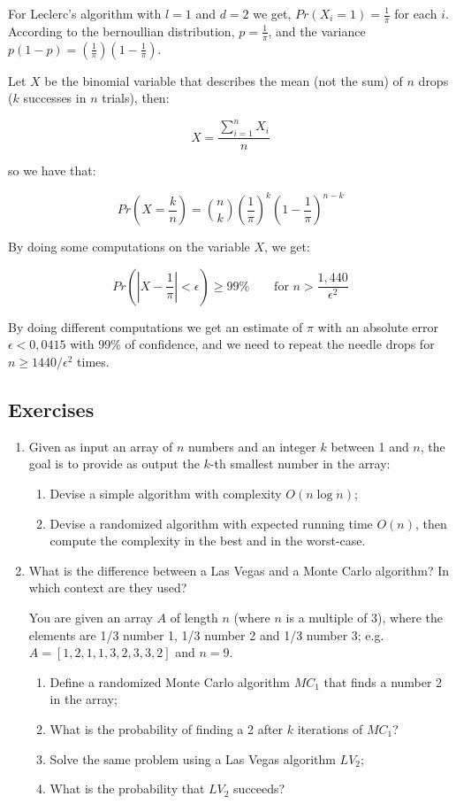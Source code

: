 For Leclerc’s algorithm with $l=1$ and $d=2$ we get, $Pr(X_i= 1) = \frac{1}{\pi}$ for each $i$. According to the bernoullian distribution, $p = \frac{1}{\pi}$, and the variance $p(1-p)= (\frac{1}{\pi}) (1- \frac{1}{\pi})$.

Let $X$ be the binomial variable that describes the mean (not the sum) of $n$ drops ($k$ successes in $n$ trials), then:

$$
X = \frac{\sum_{i = 1}^n X_i}{n}
$$

so we have that:

$$
Pr\left(X = \frac{k}{n}\right) = \binom{n}{k} \left(\frac{1}{\pi}\right)^k \left(1 - \frac{1}{\pi}\right)^{n-k}
$$

By doing some computations on the variable $X$, we get:

$$
Pr\left( \left|X-\frac{1}{\pi}\right| < \epsilon \right) \geq 99\% \qquad \text{for } n > \frac{1,440}{\epsilon^2}
$$

By doing different computations we get an estimate of $\pi$ with an absolute error $\epsilon < 0,0415$ with 99\% of confidence, and we need to repeat the needle drops for $n \geq 1440/\epsilon^2$ times.

\newpage
\subsection{Exercises}
\begin{enumerate}
    \item Given as input an array of $n$ numbers and an integer $k$ between 1 and $n$, the goal is to provide as output the $k$-th smallest number in the array:
    \begin{enumerate}
        \item Devise a simple algorithm with complexity $O(n \log n)$;
        \item Devise a randomized algorithm with expected running time $O(n)$, then compute the complexity in the best and in the worst-case.
    \end{enumerate}
    \item What is the difference between a Las Vegas and a Monte Carlo algorithm? In which context are they used?

    You are given an array $A$ of length $n$ (where $n$ is a multiple of 3), where the elements are 1/3 number 1, 1/3 number 2 and 1/3 number 3; e.g. $A = [1,2,1,1,3,2,3,3,2]$ and $n = 9$.
    \begin{enumerate}
        \item Define a randomized Monte Carlo algorithm $MC_1$ that finds a number 2 in the array;
        \item What is the probability of finding a 2 after $k$ iterations of $MC_1$?
        \item Solve the same problem using a Las Vegas algorithm $LV_2$;
        \item What is the probability that $LV_2$ succeeds?
    \end{enumerate}
\end{enumerate}